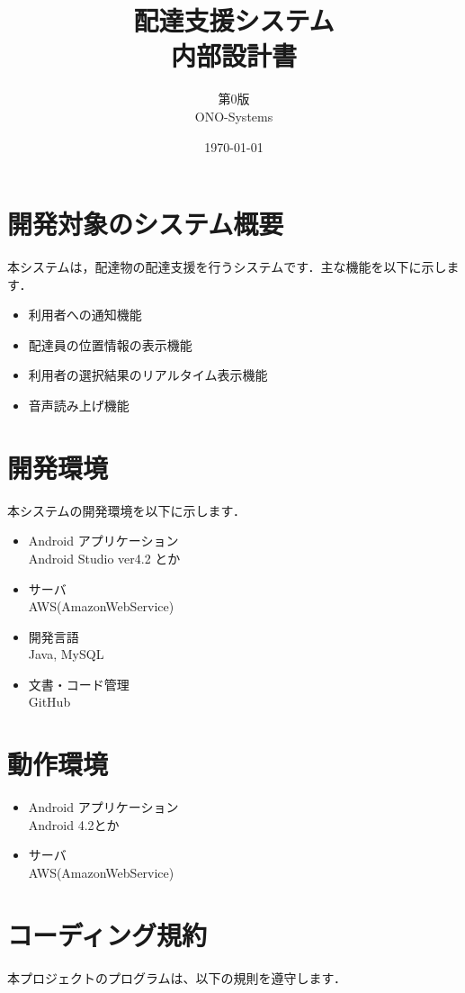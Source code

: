 \documentclass[a4j,titlepage]{jarticle}
\title{\huge 配達支援システム\\
		内部設計書}
\author{第0版\\
        ONO-Systems\\}
\date{\today}
\begin{document}
\maketitle

\tableofcontents
\clearpage


\section{開発対象のシステム概要}
本システムは，配達物の配達支援を行うシステムです．主な機能を以下に示します．
\begin{itemize}
\item 利用者への通知機能
\item 配達員の位置情報の表示機能
\item 利用者の選択結果のリアルタイム表示機能
\item 音声読み上げ機能
\end{itemize}


\section{開発環境}
本システムの開発環境を以下に示します．
\begin{itemize}
\item Android アプリケーション\\
  Android Studio ver4.2 とか
\item サーバ\\
  AWS(AmazonWebService)
\item 開発言語\\
  Java, MySQL
\item 文書・コード管理\\
  GitHub
\end{itemize}


\section{動作環境}
\begin{itemize}
\item Android アプリケーション\\
  Android 4.2とか
\item サーバ\\
  AWS(AmazonWebService)
\end{itemize}


\section{コーディング規約}
本プロジェクトのプログラムは、以下の規則を遵守します．
\end{document}
